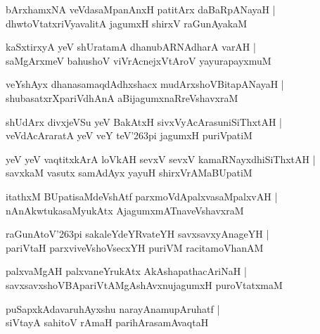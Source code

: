 \documentclass[twoside,12pt,openright]{book}
\def\S{\char'263}
\newcounter{shloka}[chapter]
\begin{document}
\begin{shloka}%
bArxhamxNA veVdasaMpanAnxH patitArx daBaRpANayaH |\\
dhwtoVtatxriVyavalitA jagumxH shirxV raGunAyakaM 
\end{shloka}

\begin{shloka}%
kaSxtirxyA yeV shUratamA dhanubARNAdharA varAH |\\
saMgArxmeV bahushoV viVrAcnejxVtAroV yayurapayxmuM 
\end{shloka}

\begin{shloka}%
veYshAyx dhanasamaqdAdhxshacx mudArxshoVBitapANayaH |\\
shubasatxrXpariVdhAnA aBijagumxnaRreVshavxraM 
\end{shloka}

\begin{shloka}%
shUdArx divxjeVSu yeV BakAtxH sivxVyAcArasuniSiThxtAH |\\
veVdAcAraratA yeV veY teV\S pi jagumxH puriVpatiM
\end{shloka}

\begin{shloka}%
yeV yeV vaqtitxkArA loVkAH sevxV sevxV kamaRNayxdhiSiThxtAH |\\
savxkaM vasutx samAdAyx yayuH shirxVrAMaBUpatiM 
\end{shloka}

\begin{shloka}%
itathxM BUpatisaMdeVshAtf parxmoVdApalxvasaMpalxvAH |\\
nAnAkwtukasaMyukAtx AjagumxmATnaveVshavxraM 
\end{shloka}

\begin{shloka}%
raGunAtoV\S pi sakaleYdeYRvateYH savxsavxyAnageYH |\\
pariVtaH parxviveVshoVsecxYH puriVM racitamoVhanAM 
\end{shloka}

\begin{shloka}%
palxvaMgAH  palxvaneYrukAtx AkAshapathacAriNaH |\\
savxsavxshoVBApariVtAMgAshAvxnujagumxH puroVtatxmaM 
\end{shloka}

\begin{shloka}%
puSapxkAdavaruhAyxshu narayAnamupAruhatf |\\
siVtayA sahitoV rAmaH parihArasamAvaqtaH 
\end{shloka}
\end{document}
